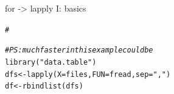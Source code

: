 \documentclass[xcolor=table,       handout,    xcolor=dvipsnames]{beamer}\usepackage[]{graphicx}\usepackage[]{color}
\makeatletter
\newcommand{\hlstr}[1]{\textcolor[rgb]{0.545,0.137,0.137}{#1}}
\newcommand{\hlcom}[1]{\textcolor[rgb]{0,0.392,0}{\textit{#1}}}
\newcommand{\hlstd}[1]{\textcolor[rgb]{0,0,0}{#1}}
\newcommand{\hlkwb}[1]{\textcolor[rgb]{0,0,0}{#1}}
\newcommand{\hlkwc}[1]{\textcolor[rgb]{1,0,1}{#1}}
\newcommand{\hlkwd}[1]{\textcolor[rgb]{0,0,1}{#1}}
\newenvironment{kframe}{%
 \def\at@end@of@kframe{}%
 \ifinner\ifhmode%
  \def\at@end@of@kframe{\end{minipage}}%
  \begin{minipage}{\columnwidth}%
 \fi\fi%
 \def\FrameCommand##1{\hskip\@totalleftmargin \hskip-\fboxsep
 \colorbox{shadecolor}{##1}\hskip-\fboxsep
     \hskip-\linewidth \hskip-\@totalleftmargin \hskip\columnwidth}%
 \MakeFramed {\advance\hsize-\width
   \@totalleftmargin\z@ \linewidth\hsize
   \@setminipage}}%
 {\par\unskip\endMakeFramed%
 \at@end@of@kframe}
\newenvironment{knitrout}{}{} %
\makeatother
\begin{document}
\begin{frame}[fragile]{for -> lapply I: basics}
\begin{knitrout}
\begin{kframe}
\begin{alltt}
\hlcom{#}
\end{alltt}
\end{kframe}
\end{knitrout}
\pause \vspace{-2.7em}
\begin{knitrout}
\color{fgcolor}\begin{kframe}
\begin{alltt}
\hlcom{# PS: much faster in this example could be}
\hlkwd{library}\hlstd{(}\hlstr{"data.table"}\hlstd{)}
\hlstd{dfs} \hlkwb{<-} \hlkwd{lapply}\hlstd{(}\hlkwc{X}\hlstd{=files,} \hlkwc{FUN}\hlstd{=fread,} \hlkwc{sep}\hlstd{=}\hlstr{","}\hlstd{)}
\hlstd{df} \hlkwb{<-} \hlkwd{rbindlist}\hlstd{(dfs)}
\end{alltt}
\end{kframe}
\end{knitrout}
\end{frame}

\end{document}
